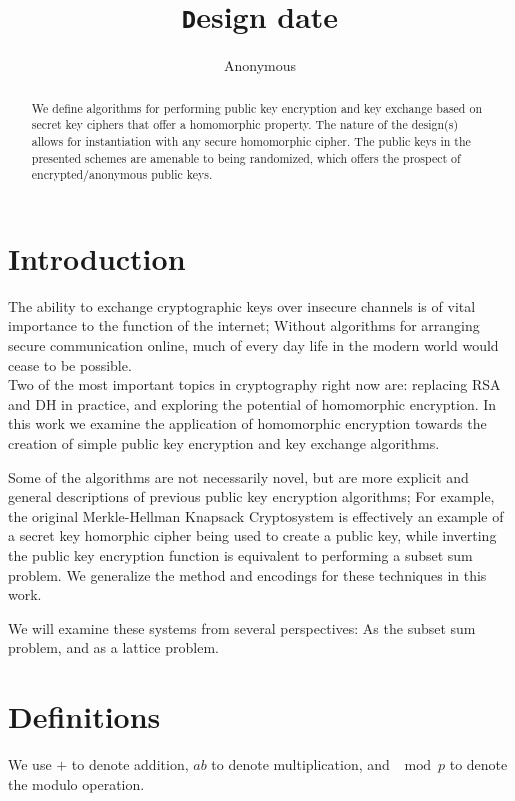 \documentclass[preprint]{iacrtrans}
\author{Anonymous\inst{1}}
\institute{City, State \email{address@provider.com}}
\title[\texttt Design date]{\texttt Design date}
\begin{document}
\maketitle


\begin{abstract}
  We define algorithms for performing public key encryption and key exchange based on secret key ciphers that offer a homomorphic property. The nature of the design(s) allows for instantiation with any secure homomorphic cipher. The public keys in the presented schemes are amenable to being randomized, which offers the prospect of encrypted/anonymous public keys.
\end{abstract}

\todototoc
\listoftodos

\section{Introduction}
 The ability to exchange cryptographic keys over insecure channels is of vital importance to the function of the internet; Without algorithms for arranging secure communication online, much of every day life in the modern world would cease to be possible.\\

Two of the most important topics in cryptography right now are: replacing RSA and DH in practice, and exploring the potential of homomorphic encryption. In this work we examine the application of homomorphic encryption towards the creation of simple public key encryption and key exchange algorithms.

Some of the algorithms are not necessarily novel, but are more explicit and general descriptions of previous public key encryption algorithms; For example, the original Merkle-Hellman Knapsack Cryptosystem is effectively an example of a secret key homorphic cipher being used to create a public key, while inverting the public key encryption function is equivalent to performing a subset sum problem. We generalize the method and encodings for these techniques in this work.

We will examine these systems from several perspectives: As the subset sum problem, and as a lattice problem.

\section{Definitions}
We use $+$ to denote addition, $ab$ to denote multiplication, and $\mod p$ to denote the modulo operation.
\end{document}
